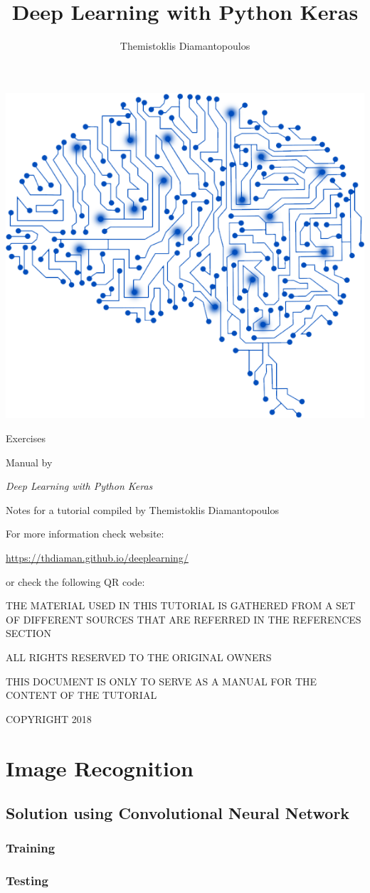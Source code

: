 \documentclass[10pt,twoside,a4paper,openany]{memoir}
\author{Themistoklis Diamantopoulos}
\title{Deep Learning with Python Keras}
\date{}
\makeatletter
\def\maketitle{%
  \null
  \thispagestyle{empty}%
  \vfill

  \begin{center}
    \normalfont
    \centering

    \begin{minipage}{\linewidth}
    \centering
    \includegraphics[scale=0.3]{images/box-icon.png}
    \end{minipage}

    \vskip 1cm
    
    {\huge\@title\par}%
    \hrulefill\par
    \vskip 0.25cm
    {\LARGE Exercises}
    \vskip 0.75cm

    {\LARGE\raggedleft Manual by \@author\par}%
  \end{center}%
  \vfill
  \null
  \clearpage
  }
\makeatother
\begin{document}
\maketitle

\frontmatter

\null
\thispagestyle{empty}%
\vfill

\begin{flushleft}
\textit{Deep Learning with Python Keras}

Notes for a tutorial compiled by Themistoklis Diamantopoulos

\vskip 0.2cm

For more information check website:

\url{https://thdiaman.github.io/deeplearning/}

or check the following QR code:

\vskip 0.2cm


\bigskip

THE MATERIAL USED IN THIS TUTORIAL IS GATHERED FROM A SET OF DIFFERENT SOURCES THAT ARE REFERRED IN THE REFERENCES SECTION

\vskip 0.2cm
ALL RIGHTS RESERVED TO THE ORIGINAL OWNERS

\vskip 0.2cm
THIS DOCUMENT IS ONLY TO SERVE AS A MANUAL FOR THE CONTENT OF THE TUTORIAL

\vskip 0.2cm
COPYRIGHT 2018

\end{flushleft}



\mainmatter

\chapter{Image Recognition}

\section{Solution using Convolutional Neural Network}
\subsection{Training}


\subsection{Testing}

\end{document}
